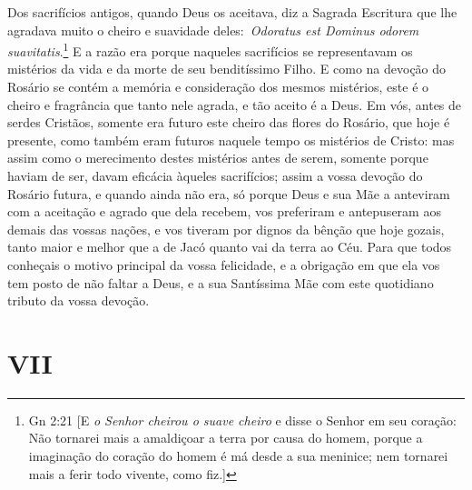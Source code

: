 Dos sacrifícios antigos, quando Deus os aceitava, diz a
Sagrada Escritura que lhe agradava muito o cheiro e suavidade
deles:~\emph{Odoratus est Dominus odorem suavitatis}.\footnote{Gn 2:21 [E \textit{o Senhor cheirou o suave cheiro} e disse o Senhor em seu coração: Não tornarei mais a amaldiçoar a terra por causa do homem, porque a imaginação do coração do homem é má desde
a sua meninice; nem tornarei mais a ferir todo vivente, como fiz.]}
E a razão era porque naqueles sacrifícios se representavam os mistérios
da vida e da morte de seu benditíssimo Filho. E como na devoção do
Rosário se contém a memória e consideração dos mesmos mistérios, este é
o cheiro e fragrância que tanto nele agrada, e tão aceito é a Deus. Em
vós, antes de serdes Cristãos, somente era futuro este cheiro das flores
do Rosário, que hoje é presente, como também eram futuros naquele tempo
os mistérios de Cristo: mas assim como o merecimento destes mistérios
antes de serem, somente porque haviam de ser, davam eficácia àqueles
sacrifícios; assim a vossa devoção do Rosário futura, e quando ainda não
era, só porque Deus e sua Mãe a anteviram com a aceitação e agrado que
dela recebem, vos preferiram e antepuseram aos demais das vossas nações,
e vos tiveram por dignos da bênção que hoje gozais, tanto maior e melhor
que a de Jacó quanto vai da terra ao Céu. Para que todos conheçais o
motivo principal da vossa felicidade, e a obrigação em que ela vos tem
posto de não faltar a Deus, e a sua Santíssima Mãe com este quotidiano
tributo da vossa devoção.


\section*{VII}

